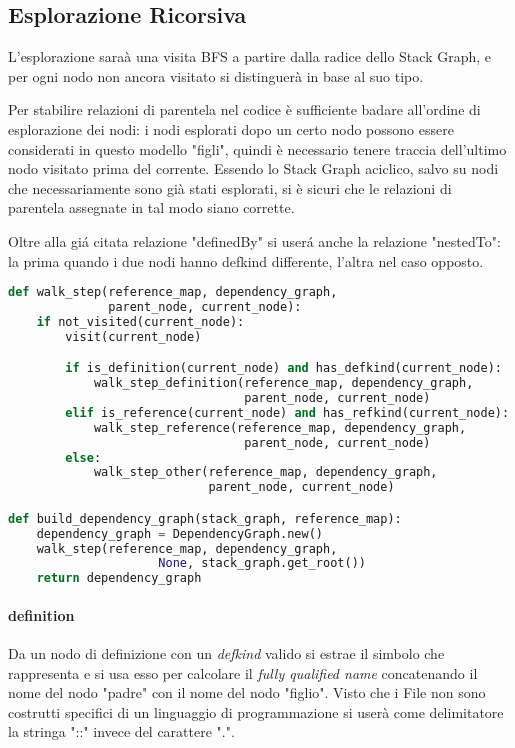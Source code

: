 \subsection{Esplorazione Ricorsiva}

L'esplorazione sara\`a una visita BFS a partire dalla radice dello Stack Graph, e per ogni nodo non ancora visitato si distinguer\`a in base al suo tipo.

Per stabilire relazioni di parentela nel codice \`e sufficiente badare all'ordine di esplorazione dei nodi: i nodi esplorati dopo un certo nodo possono essere considerati in questo modello "figli", quindi \`e necessario tenere traccia dell'ultimo nodo visitato prima del corrente. Essendo lo Stack Graph aciclico, salvo su nodi che necessariamente sono gi\`a stati esplorati, si \`e sicuri che le relazioni di parentela assegnate in tal modo siano corrette.

Oltre alla gi\'a citata relazione "definedBy" si user\'a anche la relazione "nestedTo": la prima quando i due nodi hanno defkind differente, l'altra nel caso opposto.

\begin{lstlisting}[language=Python, caption=pseudocodice]
def walk_step(reference_map, dependency_graph,
              parent_node, current_node):
    if not_visited(current_node):
        visit(current_node)

        if is_definition(current_node) and has_defkind(current_node):
            walk_step_definition(reference_map, dependency_graph,
                                 parent_node, current_node)
        elif is_reference(current_node) and has_refkind(current_node):
            walk_step_reference(reference_map, dependency_graph,
                                 parent_node, current_node)
        else:
            walk_step_other(reference_map, dependency_graph,
                            parent_node, current_node)

def build_dependency_graph(stack_graph, reference_map):
    dependency_graph = DependencyGraph.new()
    walk_step(reference_map, dependency_graph,
                     None, stack_graph.get_root())
    return dependency_graph
\end{lstlisting}

\paragraph{definition}

Da un nodo di definizione con un \emph{defkind} valido si estrae il simbolo che rappresenta e si usa esso per calcolare il \emph{fully qualified name} concatenando il nome del nodo "padre" con il nome del nodo "figlio". Visto che i File non sono costrutti specifici di un linguaggio di programmazione si user\`a come delimitatore la stringa "::" invece del carattere ".".

